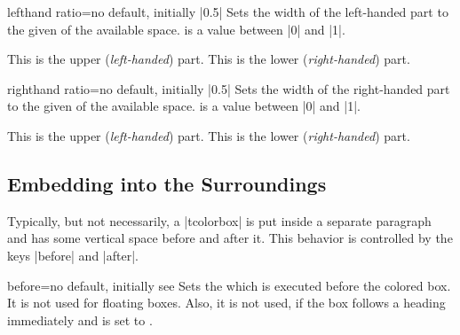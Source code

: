 \clearpage
\begin{docTcbKey}{lefthand ratio}{=}{no default, initially |0.5|}
Sets the width of the left-handed part to the given  of
the available space.  is a value between |0| and |1|.
\begin{dispExample}

\begin{tcolorbox}[title=My title,sidebyside,lefthand ratio=0.25]
This is the upper (\textit{left-handed}) part.
\tcblower
This is the lower (\textit{right-handed}) part.
\end{tcolorbox}
\end{dispExample}
\end{docTcbKey}


\begin{docTcbKey}{righthand ratio}{=}{no default, initially |0.5|}
Sets the width of the right-handed part to the given  of
the available space.  is a value between |0| and |1|.
\begin{dispExample}

\begin{tcolorbox}[title=My title,sidebyside,righthand ratio=0.25]
This is the upper (\textit{left-handed}) part.
\tcblower
This is the lower (\textit{right-handed}) part.
\end{tcolorbox}
\end{dispExample}
\end{docTcbKey}


\clearpage
\subsection{Embedding into the Surroundings}\label{subsec:surroundings}
Typically, but not necessarily, a |tcolorbox| is put inside a separate paragraph
and has some vertical space before and after it.
This behavior is controlled by the keys |before| and |after|.

\begin{docTcbKey}{before}{=}{no default, initially see }
  Sets the  which is executed before the colored box.
  It is not used for floating boxes.
  Also, it is not used, if the box follows a heading immediately
  and  is set to .
\end{docTcbKey}

